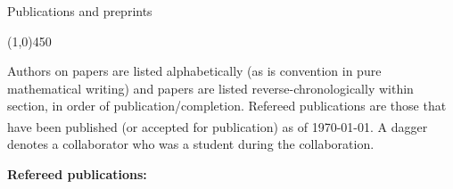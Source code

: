 \documentclass[10pt]{article}
\begin{document}
\bigskip
\noindent
{\large \sc Publications and preprints}

\vspace{-0.1in}
\noindent
\line(1,0){450}

\smallskip

\noindent Authors on papers are listed alphabetically (as is convention in pure mathematical writing)
and papers are listed reverse-chronologically within section, in order of publication/completion.
Refereed publications are those that have been published 
(or accepted for publication) as of \today.
A dagger\textsuperscript{\textdagger} denotes a collaborator who was a student during the collaboration.

\medskip

\noindent\textbf{Refereed publications:}
\end{document}

